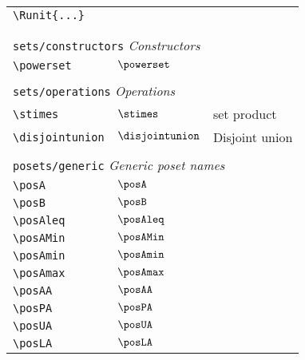 \begin{longtable}{lll}
 {\color[rgb]{0.5,0.5,0.5}\texttt{\textbackslash Runit\{...\}}} &  & \\ 
  &  & {\setlength\fboxsep{1pt}%
\fbox{%
\color[rgb]{0.5,0.5,0.5}\begin{minipage}[]{5cm}%
$\Runit{a}$\par%
{\footnotesize{\texttt{\$\textbackslash Runit\{a\}\$}}}\end{minipage}%
}%
}%
\\ 
  &  & \\ 
 \multicolumn{3}{l}{{\color[rgb]{0.5,0.5,0.5}\texttt{sets/constructors}} \emph{Constructors}}\\ 
 \hline
{\color[rgb]{0.5,0.5,0.5}\texttt{\textbackslash powerset}} & $\powerset$ & \\ 
  &  & \\ 
 \multicolumn{3}{l}{{\color[rgb]{0.5,0.5,0.5}\texttt{sets/operations}} \emph{Operations}}\\ 
 \hline
{\color[rgb]{0.5,0.5,0.5}\texttt{\textbackslash stimes}} & $\stimes$ &  set product\\ 
 {\color[rgb]{0.5,0.5,0.5}\texttt{\textbackslash disjointunion}} & $\disjointunion$ &  Disjoint union\\ 
  &  & \\ 
 \multicolumn{3}{l}{{\color[rgb]{0.5,0.5,0.5}\texttt{posets/generic}} \emph{Generic poset names}}\\ 
 \hline
{\color[rgb]{0.5,0.5,0.5}\texttt{\textbackslash posA}} & $\posA$ & \\ 
 {\color[rgb]{0.5,0.5,0.5}\texttt{\textbackslash posB}} & $\posB$ & \\ 
 {\color[rgb]{0.5,0.5,0.5}\texttt{\textbackslash posAleq}} & $\posAleq$ & \\ 
 {\color[rgb]{0.5,0.5,0.5}\texttt{\textbackslash posAMin}} & $\posAMin$ & \\ 
 {\color[rgb]{0.5,0.5,0.5}\texttt{\textbackslash posAmin}} & $\posAmin$ & \\ 
 {\color[rgb]{0.5,0.5,0.5}\texttt{\textbackslash posAmax}} & $\posAmax$ & \\ 
 {\color[rgb]{0.5,0.5,0.5}\texttt{\textbackslash posAA}} & $\posAA$ & \\ 
 {\color[rgb]{0.5,0.5,0.5}\texttt{\textbackslash posPA}} & $\posPA$ & \\ 
 {\color[rgb]{0.5,0.5,0.5}\texttt{\textbackslash posUA}} & $\posUA$ & \\ 
 {\color[rgb]{0.5,0.5,0.5}\texttt{\textbackslash posLA}} & $\posLA$ & \\ 

\end{longtable}
